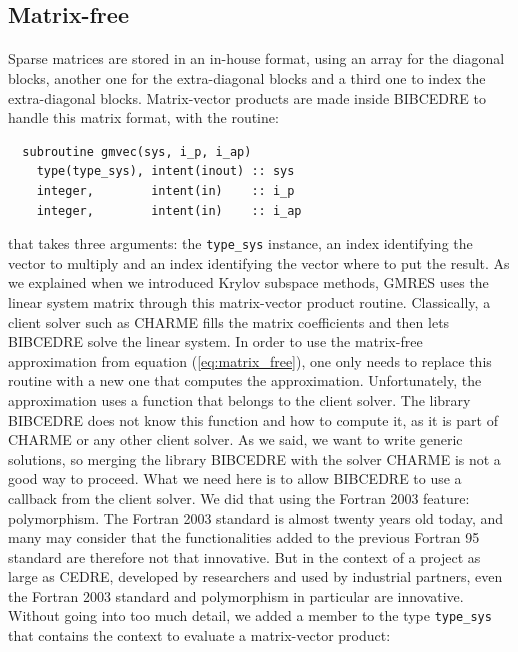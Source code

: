     \subsection{Matrix-free}

      \paragraph{}
      Sparse matrices are stored in an in-house format, using an array for the diagonal blocks, another one for the extra-diagonal blocks and a third one to index the extra-diagonal blocks.
      Matrix-vector products are made inside BIBCEDRE to handle this matrix format, with the routine:
\begin{verbatim}
  subroutine gmvec(sys, i_p, i_ap)
    type(type_sys), intent(inout) :: sys
    integer,        intent(in)    :: i_p
    integer,        intent(in)    :: i_ap
\end{verbatim}
      that takes three arguments: the \texttt{type_sys} instance, an index identifying the vector to multiply and an index identifying the vector where to put the result.
      As we explained when we introduced Krylov subspace methods, GMRES uses the linear system matrix through this matrix-vector product routine.
      Classically, a client solver such as CHARME fills the matrix coefficients and then lets BIBCEDRE solve the linear system.
      In order to use the matrix-free approximation from equation (\ref{eq:matrix_free}), one only needs to replace this routine with a new one that computes the approximation.
      Unfortunately, the approximation uses a function that belongs to the client solver.
      The library BIBCEDRE does not know this function and how to compute it, as it is part of CHARME or any other client solver.
      As we said, we want to write generic solutions, so merging the library BIBCEDRE with the solver CHARME is not a good way to proceed.
      What we need here is to allow BIBCEDRE to use a callback from the client solver.
      We did that using the Fortran 2003 feature: polymorphism.
      The Fortran 2003 standard is almost twenty years old today, and many may consider that the functionalities added to the previous Fortran 95 standard are therefore not that innovative.
      But in the context of a project as large as CEDRE, developed by researchers and used by industrial partners, even the Fortran 2003 standard and polymorphism in particular are innovative.
      Without going into too much detail, we added a member to the type \texttt{type_sys} that contains the context to evaluate a matrix-vector product:
